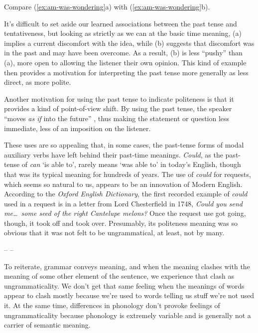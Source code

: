 Compare (\ref{ex:am-was-wondering}a) with (\ref{ex:am-was-wondering}b).

\ea \label{ex:am-was-wondering}
    \z
\z

It's difficult to set aside our learned associations between the past tense and tentativeness, but looking as strictly as we can at the basic time meaning, (a) implies a current discomfort with the idea, while (b) suggests that discomfort was in the past and may have been overcome. As a result, (b) is less ``pushy'' than (a), more open to allowing the listener their own opinion. This kind of example then provides a motivation for interpreting the past tense more generally as less direct, as more polite.

Another motivation for using the past tense to indicate politeness is that it provides a kind of point-of-view shift. By using the past tense, the speaker ``moves \textit{as if} into the future'' \citep[204]{Brown1978}, thus making the statement or question less immediate, less of an imposition on the listener.

These uses are so appealing that, in some cases, the past-tense forms of modal auxiliary verbs have left behind their past-time meanings. \textit{Could}, as the past-tense of \textit{can} `is able to', rarely means `was able to' in today's English, though that was its typical meaning for hundreds of years. The use of \textit{could} for requests, which seems so natural to us, appears to be an innovation of Modern English. According to the \textit{Oxford English Dictionary}, the first recorded example of \textit{could} used in a request is in a letter from Lord Chesterfield in 1748, \textit{Could you send me\dots~some seed of the right Cantelupe melons?} Once the request use got going, though, it took off and took over. Presumably, its politeness meaning was so obvious that it was not felt to be ungrammatical, at least, not by many.

\begin{center}
    -- --
\end{center}

To reiterate, grammar conveys meaning, and when the meaning clashes with the meaning of some other element of the sentence, we experience that clash as ungrammaticality. We don't get that same feeling when the meanings of words appear to clash mostly because we're used to words telling us stuff we're not used it. At the same time, differences in phonology don't provoke feelings of ungrammaticality because phonology is extremely variable and is generally not a carrier of semantic meaning.

